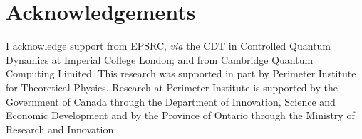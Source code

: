 \documentclass{article}
\theoremstyle{definition}
\begin{document}


\section{Acknowledgements}
I acknowledge support from EPSRC, \emph{via} the CDT in Controlled Quantum Dynamics at Imperial College London; and from Cambridge Quantum Computing Limited. This research was supported in part by Perimeter Institute for Theoretical Physics. Research at Perimeter Institute is supported by the Government of Canada through the Department of Innovation, Science and Economic Development and by the Province of Ontario through the Ministry of Research and Innovation.

\nocite{Berm2016}
\nocite{Aren2011}
\nocite{Abra2017}
\nocite{SimmCC}
\nocite{Wits1974}
\nocite{Soif2008}
\nocite{Renn2004}
\nocite{Polj1974}
\nocite{Gare1979}
\nocite{Pere1991}
\nocite{Zycz2000}
\nocite{Alon2010}
\nocite{Pere1991}
\nocite{Cabe1997}
\nocite{Pere1991}
\nocite{Alon2010}
\nocite{Zycz2000}
\nocite{Kerm2011}
\nocite{Wits1974}
\nocite{DeCo2015}
\nocite{DeCo2015}
\nocite{Soif2008}
\nocite{Kara2017}


{}

\end{document}
